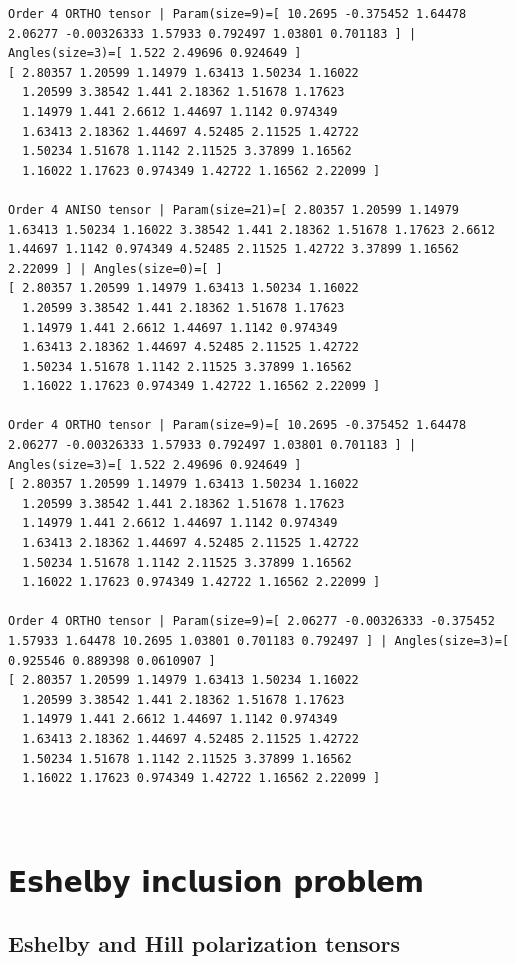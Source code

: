 \documentclass[
  a4paper,
  numbers=noendperiod,
  DIV=12]{scrreprt}
\begin{document}
\begin{tcolorbox}
\begin{verbatim}
Order 4 ORTHO tensor | Param(size=9)=[ 10.2695 -0.375452 1.64478 2.06277 -0.00326333 1.57933 0.792497 1.03801 0.701183 ] | Angles(size=3)=[ 1.522 2.49696 0.924649 ]
[ 2.80357 1.20599 1.14979 1.63413 1.50234 1.16022 
  1.20599 3.38542 1.441 2.18362 1.51678 1.17623 
  1.14979 1.441 2.6612 1.44697 1.1142 0.974349 
  1.63413 2.18362 1.44697 4.52485 2.11525 1.42722 
  1.50234 1.51678 1.1142 2.11525 3.37899 1.16562 
  1.16022 1.17623 0.974349 1.42722 1.16562 2.22099 ]

Order 4 ANISO tensor | Param(size=21)=[ 2.80357 1.20599 1.14979 1.63413 1.50234 1.16022 3.38542 1.441 2.18362 1.51678 1.17623 2.6612 1.44697 1.1142 0.974349 4.52485 2.11525 1.42722 3.37899 1.16562 2.22099 ] | Angles(size=0)=[ ]
[ 2.80357 1.20599 1.14979 1.63413 1.50234 1.16022 
  1.20599 3.38542 1.441 2.18362 1.51678 1.17623 
  1.14979 1.441 2.6612 1.44697 1.1142 0.974349 
  1.63413 2.18362 1.44697 4.52485 2.11525 1.42722 
  1.50234 1.51678 1.1142 2.11525 3.37899 1.16562 
  1.16022 1.17623 0.974349 1.42722 1.16562 2.22099 ]

Order 4 ORTHO tensor | Param(size=9)=[ 10.2695 -0.375452 1.64478 2.06277 -0.00326333 1.57933 0.792497 1.03801 0.701183 ] | Angles(size=3)=[ 1.522 2.49696 0.924649 ]
[ 2.80357 1.20599 1.14979 1.63413 1.50234 1.16022 
  1.20599 3.38542 1.441 2.18362 1.51678 1.17623 
  1.14979 1.441 2.6612 1.44697 1.1142 0.974349 
  1.63413 2.18362 1.44697 4.52485 2.11525 1.42722 
  1.50234 1.51678 1.1142 2.11525 3.37899 1.16562 
  1.16022 1.17623 0.974349 1.42722 1.16562 2.22099 ]

Order 4 ORTHO tensor | Param(size=9)=[ 2.06277 -0.00326333 -0.375452 1.57933 1.64478 10.2695 1.03801 0.701183 0.792497 ] | Angles(size=3)=[ 0.925546 0.889398 0.0610907 ]
[ 2.80357 1.20599 1.14979 1.63413 1.50234 1.16022 
  1.20599 3.38542 1.441 2.18362 1.51678 1.17623 
  1.14979 1.441 2.6612 1.44697 1.1142 0.974349 
  1.63413 2.18362 1.44697 4.52485 2.11525 1.42722 
  1.50234 1.51678 1.1142 2.11525 3.37899 1.16562 
  1.16022 1.17623 0.974349 1.42722 1.16562 2.22099 ]
\end{verbatim}

\end{tcolorbox}

\(\,\)

\part{𝗘𝘀𝗵𝗲𝗹𝗯𝘆 𝗶𝗻𝗰𝗹𝘂𝘀𝗶𝗼𝗻 𝗽𝗿𝗼𝗯𝗹𝗲𝗺}

\chapter{Eshelby and Hill polarization tensors}\label{sec-eshelby_hill}
\end{document}
